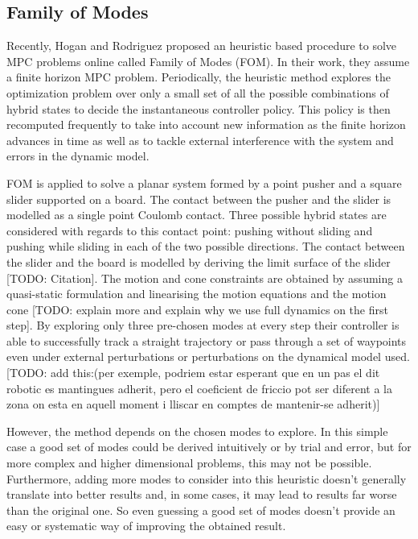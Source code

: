 \documentclass[12,twoside]{TFG-GM}
\theoremstyle{definition}
\theoremstyle{remark}
\begin{document}
\subsection{Family of Modes}
\label{subsec:fom}
Recently, Hogan and Rodriguez \cite{fom} proposed an heuristic based procedure to solve MPC problems online called Family of Modes (FOM). In their work, they assume a finite horizon MPC problem. Periodically, the heuristic method explores the optimization problem over only a small set of all the possible combinations of hybrid states to decide the instantaneous controller policy. This policy is then recomputed frequently to take into account new information as the finite horizon advances in time as well as to tackle external interference with the system and errors in the dynamic model.

FOM is applied to solve a planar system formed by a point pusher and a square slider supported on a board. The contact between the pusher and the slider is modelled as a single point Coulomb contact. Three possible hybrid states are considered with regards to this contact point: pushing without sliding and pushing while sliding in each of the two possible directions. The contact between the slider and the board is modelled by deriving the limit surface of the slider [TODO: Citation]. The motion and cone constraints are obtained by assuming a quasi-static formulation and linearising the motion equations and the motion cone [TODO: explain more and explain why we use full dynamics on the first step]. By exploring only three pre-chosen modes at every step their controller is able to successfully track a straight trajectory or pass through a set of waypoints even under external perturbations or perturbations on the dynamical model used. [TODO: add this:(per exemple, podriem estar esperant que en un pas el dit robotic es mantingues adherit, pero el coeficient de friccio pot ser diferent a la zona on esta en aquell moment i lliscar en comptes de mantenir-se adherit)]

However, the method depends on the chosen modes to explore. In this simple case a good set of modes could be derived intuitively or by trial and error, but for more complex and higher dimensional problems, this may not be possible. Furthermore, adding more modes to consider into this heuristic doesn't generally translate into better results and, in some cases, it may lead to results far worse than the original one. So even guessing a good set of modes doesn't provide an easy or systematic way of improving the obtained result.
\end{document}
